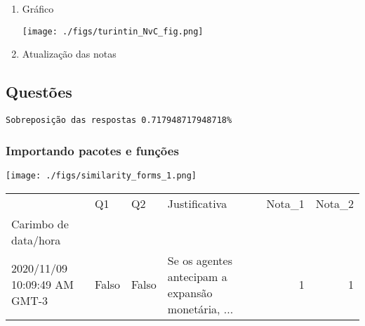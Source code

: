 \documentclass[11pt]{article}
\begin{document}
\begin{enumerate}
\item Gráfico
\label{sec:orgd726e14}
\begin{center}
\texttt{[image: ./figs/turintin\_NvC\_fig.png]}
\end{center}
\item Atualização das notas
\label{sec:org639dddc}
\end{enumerate}
\subsection{Questões}
\label{sec:org348d015}

\begin{verbatim}
Sobreposição das respostas 0.717948717948718%
\end{verbatim}

\subsubsection{Importando pacotes e funções}
\label{sec:orgfb5b84a}

\begin{center}
\texttt{[image: ./figs/similarity\_forms\_1.png]}
\end{center}


\begin{tabular}{llllrr}
\toprule
{} &     Q1 &     Q2 &                                      Justificativa &  Nota\_1 &  Nota\_2 \\
Carimbo de data/hora         &        &        &                                                    &         &         \\
\midrule
2020/11/09 10:09:49 AM GMT-3 &  Falso &  Falso &  Se os agentes antecipam a expansão monetária, ... &       1 &       1 \\
\bottomrule
\end{tabular}
\end{document}
